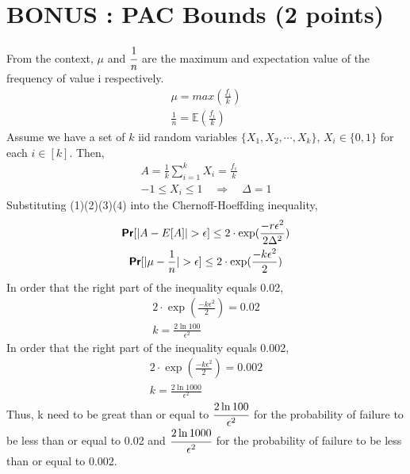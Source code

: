\documentclass[11pt]{article}
\renewcommand{\Pr}{\textbf{\textsf{Pr}}}
\begin{document}
\section{BONUS : PAC Bounds (2 points)}
From the context, $\mu$ and $\cfrac{1}{n}$ are the maximum and expectation value of the frequency of value i respectively.
\begin{gather}
\mu=max(\frac{f_i}{k})\\
\frac{1}{n}=\mathbb{E}(\frac{f_i}{k})
\end{gather}
Assume we have a set of $k$ iid random variables $\{X_1, X_2, \cdots, X_k\}$, $X_i \in \{0,1\}$ for each $i \in [k]$. Then,
\begin{gather}
A=\frac{1}{k}\sum_{i=1}^{k}X_i=\frac{f_i}{k}\\
-1\leq X_i\leq1\quad\Rightarrow\quad\Delta=1
\end{gather}
Substituting (1)(2)(3)(4) into the Chernoff-Hoeffding inequality,
\begin{gather}
\Pr[|A-E[A]|>\epsilon]\le2\cdot \exp(\frac{-r\epsilon^2}{2\Delta^2})\\
\Pr[|\mu-\frac{1}{n}|>\epsilon]\le2\cdot \exp(\frac{-k\epsilon^2}{2})
\end{gather}
In order that the right part of the inequality equals 0.02,
\begin{gather}
2\cdot \exp(\frac{-k\epsilon^2}{2})=0.02\\
k=\frac{2\ln100}{\epsilon^2}
\end{gather}
In order that the right part of the inequality equals 0.002,
\begin{gather}
2\cdot \exp(\frac{-k\epsilon^2}{2})=0.002\\
k=\frac{2\ln1000}{\epsilon^2}
\end{gather}
Thus, k need to be great than or equal to $\cfrac{2\ln100}{\epsilon^2}$ for the probability of failure to be less than or equal to 0.02 and $\cfrac{2\ln1000}{\epsilon^2}$ for the probability of failure to be less than or equal to 0.002.
\end{document}
